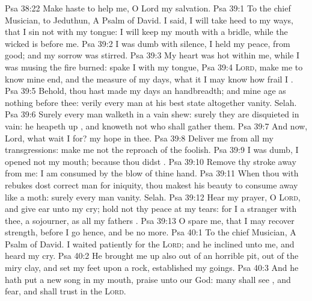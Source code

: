 \vs Psa 38:22 Make haste to help me, O Lord my salvation.
\vs Psa 39:1 To the chief Musician,  to Jeduthun, A Psalm of David. I said, I will take heed to my ways, that I sin not with my tongue: I will keep my mouth with a bridle, while the wicked is before me.
\vs Psa 39:2 I was dumb with silence, I held my peace,  from good; and my sorrow was stirred.
\vs Psa 39:3 My heart was hot within me, while I was musing the fire burned:  spake I with my tongue,
\vs Psa 39:4 \textsc{Lord}, make me to know mine end, and the measure of my days, what it  I may know how frail I .
\vs Psa 39:5 Behold, thou hast made my days  an handbreadth; and mine age  as nothing before thee: verily every man at his best state  altogether vanity. Selah.
\vs Psa 39:6 Surely every man walketh in a vain shew: surely they are disquieted in vain: he heapeth up , and knoweth not who shall gather them.
\vs Psa 39:7 And now, Lord, what wait I for? my hope  in thee.
\vs Psa 39:8 Deliver me from all my transgressions: make me not the reproach of the foolish.
\vs Psa 39:9 I was dumb, I opened not my mouth; because thou didst .
\vs Psa 39:10 Remove thy stroke away from me: I am consumed by the blow of thine hand.
\vs Psa 39:11 When thou with rebukes dost correct man for iniquity, thou makest his beauty to consume away like a moth: surely every man  vanity. Selah.
\vs Psa 39:12 Hear my prayer, O \textsc{Lord}, and give ear unto my cry; hold not thy peace at my tears: for I  a stranger with thee,  a sojourner, as all my fathers .
\vs Psa 39:13 O spare me, that I may recover strength, before I go hence, and be no more.
\vs Psa 40:1 To the chief Musician, A Psalm of David. I waited patiently for the \textsc{Lord}; and he inclined unto me, and heard my cry.
\vs Psa 40:2 He brought me up also out of an horrible pit, out of the miry clay, and set my feet upon a rock,  established my goings.
\vs Psa 40:3 And he hath put a new song in my mouth,  praise unto our God: many shall see , and fear, and shall trust in the \textsc{Lord}.
